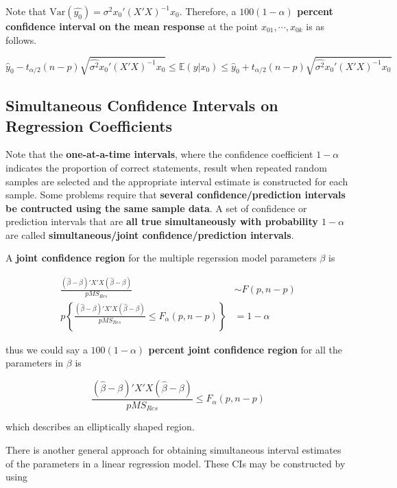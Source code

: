 \documentclass[12pt]{article}
\begin{document}
Note that $\mathrm{Var} (\hat{y_0}) = \sigma^2 x_0' (X'X)^{-1} x_0$. Therefore, a \textbf{$100(1-\alpha)$ percent confidence interval on the mean response} at the point $x_{01}, \cdots, x_{0k}$ is as follows.

$$
\hat{y}_0 - t_{\alpha/2}(n-p) \sqrt{\hat{\sigma^2} x_0' (X'X)^{-1} x_0 } \le \mathbb{E} (y | x_0) \le \hat{y}_0 + t_{\alpha/2}(n-p) \sqrt{\hat{\sigma^2} x_0' (X'X)^{-1} x_0 }
$$




\subsection{Simultaneous Confidence Intervals on Regression Coefficients}

Note that the \textbf{one-at-a-time intervals}, where the confidence coefficient $1 - \alpha$ indicates the proportion of correct statements, result when repeated random samples are selected and the appropriate interval estimate is constructed for each sample. Some problems require that \textbf{several confidence/prediction intervals be contructed using the same sample data}. A set of confidence or prediction intervals that are \textbf{all true simultaneously with probability $1 - \alpha$} are called \textbf{simultaneous/joint confidence/prediction intervals}.

A \textbf{joint confidence region} for the multiple regerssion model parameters $\beta$ is 

$$
\begin{aligned}
\frac{ \left( \hat{\beta} - \beta \right)' X' X (\hat{\beta} - \beta)   }{p MS_{Res}} &\sim F(p, n-p) \\[12pt]
p \left\{   \frac{ \left( \hat{\beta} - \beta \right)' X' X (\hat{\beta} - \beta)   }{p MS_{Res}} \le F_\alpha(p, n-p) \right\} &= 1 - \alpha
\end{aligned}
$$

thus we could say a \textbf{$100 (1 - \alpha) $ percent joint confidence region} for all the parameters in $\beta$ is

$$
\frac{ \left( \hat{\beta} - \beta \right)' X' X (\hat{\beta} - \beta)   }{p MS_{Res}}  \le F_\alpha(p, n-p)
$$

which describes an elliptically shaped region. 


\bigskip
There is another general approach for obtaining simultaneous interval estimates of the parameters in a linear regression model. These CIs may be constructed by using
\end{document}
